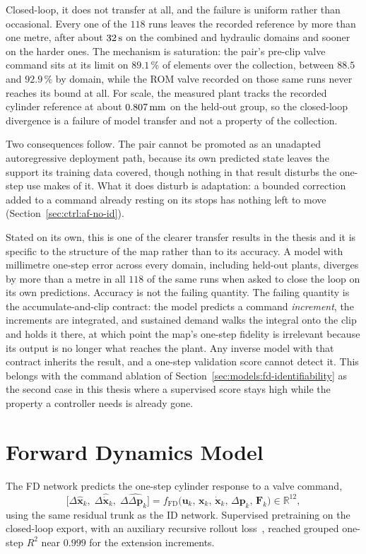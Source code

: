 Closed-loop, it does not transfer at all, and the failure is uniform rather
than occasional. Every one of the $118$ runs leaves the recorded reference by
more than one metre, after about $\unit[32]{s}$ on the combined and hydraulic
domains and sooner on the harder ones. The mechanism is saturation: the pair's
pre-clip valve command sits at its limit on $89.1\,\%$ of elements over the
collection, between $88.5$ and $92.9\,\%$ by domain, while the ROM valve
recorded on those same runs never reaches its bound at all. For scale, the
measured plant tracks the recorded cylinder reference at about
$\unit[0.807]{mm}$ on the held-out group, so the closed-loop divergence is a
failure of model transfer and not a property of the collection.

Two consequences follow. The pair cannot be promoted as an unadapted
autoregressive deployment path, because its own predicted state leaves the
support its training data covered, though nothing in that result disturbs the
one-step use \ppoIDFD{} makes of it. What it does disturb is adaptation: a
bounded correction added to a command already resting on its stops has nothing
left to move (Section~\ref{sec:ctrl:af-no-id}).

Stated on its own, this is one of the clearer transfer results in the thesis and
it is specific to the structure of the map rather than to its accuracy. A model
with millimetre one-step error across every domain, including held-out plants,
diverges by more than a metre in all $118$ of the same runs when asked to close
the loop on its own predictions. Accuracy is not the failing quantity. The
failing quantity is the accumulate-and-clip contract: the model predicts a
command \emph{increment}, the increments are integrated, and sustained demand
walks the integral onto the clip and holds it there, at which point the map's
one-step fidelity is irrelevant because its output is no longer what reaches the
plant. Any inverse model with that contract inherits the result, and a
one-step validation score cannot detect it. This belongs with the command
ablation of Section~\ref{sec:models:fd-identifiability} as the second case in
this thesis where a supervised score stays high while the property a controller
needs is already gone.

\section{Forward Dynamics Model}
\label{sec:models:fd}

The FD network predicts the one-step cylinder response to a valve command,
%
\begin{equation}
  \label{eq:models:fd-contract}
  \bigl[\Delta\hat{\bm{x}}_k,\; \Delta\hat{\dot{\bm{x}}}_k,\;
        \Delta\widehat{\Delta\bm{p}}_k\bigr]
  = f_{\mathrm{FD}}\bigl(\bm{u}_k,\, \bm{x}_k,\, \dot{\bm{x}}_k,\,
    \Delta\bm{p}_k,\, \bm{F}_k\bigr) \in \mathbb{R}^{12},
\end{equation}
%
using the same residual trunk as the ID network. Supervised pretraining on the
closed-loop export, with an auxiliary recursive rollout
loss~\cite{nagabandi2018neural}, reached grouped one-step $R^2$ near $0.999$
for the extension increments.

